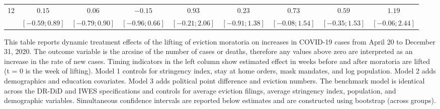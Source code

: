 \documentclass[12pt]{amsart}
\begin{document}
\begin{table}
\begin{adjustbox}{width=\textwidth}
\begin{tabular}{l c c c c | c c c c}
12 & $0.15$           & $0.06$           & $-0.15$          & $0.93$           & $0.23$           & $0.73$           & $0.59$           & $1.19$           \\
   & $ [-0.59; 0.89]$ & $ [-0.79; 0.90]$ & $ [-0.96; 0.66]$ & $ [-0.21; 2.06]$ & $ [-0.91; 1.38]$ & $ [-0.08; 1.54]$ & $ [-0.35; 1.53]$ & $ [-0.06; 2.44]$ \\
   \bottomrule
\end{tabular}
\end{adjustbox}
\label{table:CSAestimates}
{\raggedright \small{This table reports dynamic treatment effects of the lifting of eviction moratoria on increases in COVID-19 cases from April 20 to December 31, 2020. The outcome variable is the arcsine of the number of cases or deaths, therefore any values above zero are interpreted as an increase in the rate of new cases. Timing indicators in the left column show estimated effect in weeks before and after moratoria are lifted (t = 0 is the week of lifting). Model 1 controls for stringency index, stay at home orders, mask mandates, and log population. Model 2 adds demographics and education covariates. Model 3 adds political point difference and eviction numbers. The benchmark model is identical across the DR-DiD and IWES specifications and controls for average eviction filings, average stringency index, population, and demographic variables. Simultaneous confidence intervals are reported below estimates and are constructed using bootstrap (across groups). \par}}
\end{table}
\end{document}
